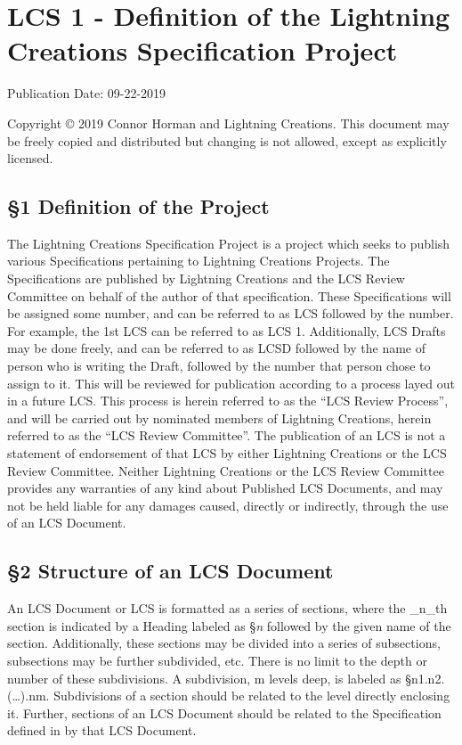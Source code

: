 \section{LCS 1 - Definition of the Lightning Creations Specification
Project}\label{lcs-1---definition-of-the-lightning-creations-specification-project}

Publication Date: 09-22-2019

Copyright © 2019 Connor Horman and Lightning Creations. This document
may be freely copied and distributed but changing is not allowed, except
as explicitly licensed.

\subsection{§1 Definition of the
Project}\label{definition-of-the-project}

The Lightning Creations Specification Project is a project which seeks
to publish various Specifications pertaining to Lightning Creations
Projects. The Specifications are published by Lightning Creations and
the LCS Review Committee on behalf of the author of that specification.
These Specifications will be assigned some number, and can be referred
to as LCS followed by the number. For example, the 1st LCS can be
referred to as LCS 1. Additionally, LCS Drafts may be done freely, and
can be referred to as LCSD followed by the name of person who is writing
the Draft, followed by the number that person chose to assign to it.
This will be reviewed for publication according to a process layed out
in a future LCS. This process is herein referred to as the ``LCS Review
Process'', and will be carried out by nominated members of Lightning
Creations, herein referred to as the ``LCS Review Committee''. The
publication of an LCS is not a statement of endorsement of that LCS by
either Lightning Creations or the LCS Review Committee. Neither
Lightning Creations or the LCS Review Committee provides any warranties
of any kind about Published LCS Documents, and may not be held liable
for any damages caused, directly or indirectly, through the use of an
LCS Document.

\subsection{§2 Structure of an LCS
Document}\label{structure-of-an-lcs-document}

An LCS Document or LCS is formatted as a series of sections, where the
\_n\_th section is indicated by a Heading labeled as §\emph{n} followed
by the given name of the section. Additionally, these sections may be
divided into a series of subsections, subsections may be further
subdivided, etc. There is no limit to the depth or number of these
subdivisions. A subdivision, m levels deep, is labeled as
§n1.n2.(\ldots{}).nm. Subdivisions of a section should be related to the
level directly enclosing it. Further, sections of an LCS Document should
be related to the Specification defined in by that LCS Document.

